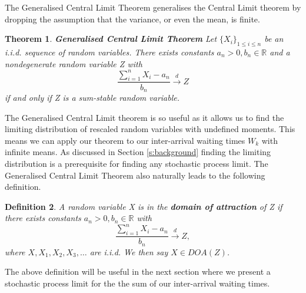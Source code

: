 \documentclass[honours,12pt]{UNSWthesis}
\newcommand{\R}{\mathbb{R}}
\newcommand{\1}{\mathbf 1}
\newtheorem{theorem}{Theorem}[section]
\newtheorem{definition}[theorem]{Definition}
\numberwithin{equation}{section}
\theoremstyle{definition}
\theoremstyle{remark}
\begin{document}
\noindent The Generalised Central Limit Theorem generalises the Central Limit theorem by dropping the assumption that the variance, or even the mean, is finite.\\

\begin{theorem}%
\textbf{Generalised Central Limit Theorem} Let $\{X_i\}_{1\leq i \leq n}$ be an i.i.d. sequence of random variables. There exists constants $a_n>0, b_n \in \R$ and a nondegenerate random variable Z with 
\[
	\frac{\sum^n_{i=1}X_i-a_n}{b_n} \overset{d}{\longrightarrow}Z
\]
if and only if Z is a sum-stable random variable.\\
\end{theorem}

\noindent The Generalised Central Limit theorem is so useful as it allows us to find the limiting distribution of rescaled random variables with undefined moments. This means we can apply our theorem to our inter-arrival waiting times $W_k$ with infinite means. As discussed in Section \ref{s:background} finding the limiting distribution is a prerequisite for finding any stochastic process limit. The Generalised Central Limit Theorem also naturally leads to the following definition.\\

\begin{definition}\cite{Nolan2015}
	A random variable X is in the \textbf{domain of attraction} of Z if there exists constants $a_n>0,b_n\in\R$ with
	\[
		\frac{\sum^n_{i=1}X_i-a_n}{b_n} \overset{d}{\longrightarrow}Z,
	\]
	where $X, X_1, X_2, X_3, \ldots$ are i.i.d. We then say $X\in DOA(Z)$.\\
\end{definition}

\noindent The above definition will be useful in the next section where we present a stochastic process limit for the the sum of our inter-arrival waiting times.\\
\end{document}

